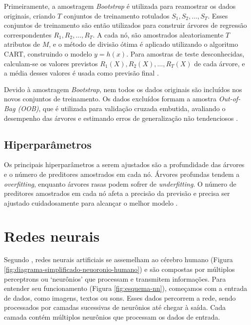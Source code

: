 Primeiramente, a amostragem \textit{Bootstrap} é utilizada para reamostrar os dados originais, criando $T$ conjuntos de treinamento rotulados $S_1, S_2, \ldots, S_T$. Esses conjuntos de treinamento são então utilizados para construir árvores de regressão correspondentes $R_1, R_2, \ldots, R_T$. A cada nó, são amostrados aleatoriamente $T$ atributos de $M$, e o método de divisão ótima é aplicado utilizando o algoritmo CART, construindo o modelo $y = h(x)$. Para amostras de teste desconhecidas, calculam-se os valores previstos $R_1(X), R_2(X), \ldots, R_T(X)$ de cada árvore, e a média desses valores é usada como previsão final \cite{Wang2023}.

Devido à amostragem \textit{Bootstrap}, nem todos os dados originais são incluídos nos novos conjuntos de treinamento. Os dados excluídos formam a amostra \textit{Out-of-Bag (OOB)}, que é utilizada para validação cruzada embutida, avaliando o desempenho das árvores e estimando erros de generalização não tendenciosos \cite{Wang2023}.

 \subsection{Hiperparâmetros}

Os principais hiperparâmetros a serem ajustados são a profundidade das árvores e o número de preditores amostrados em cada nó. Árvores profundas tendem a \textit{overfitting}, enquanto árvores rasas podem sofrer de \textit{underfitting}. O número de preditores amostrados em cada nó afeta a precisão da previsão e precisa ser ajustado cuidadosamente para alcançar o melhor modelo \cite{Wang2023}.



\section{Redes neurais}

Segundo \cite{Kufel2023}, redes neurais artificiais se assemelham ao cérebro humano (Figura \ref{fig:diagrama-simplificado-neuoronio-humano}) e são compostas por múltiplos perceptrons ou ‘neurônios’ que processam e transmitem informações. Para entender seu funcionamento (Figura \ref{fig:esquema-nn}), começamos com a entrada de dados, como imagens, textos ou sons. Esses dados percorrem a rede, sendo processados por camadas sucessivas de neurônios até chegar à saída. Cada camada contém múltiplos neurônios que processam os dados de entrada.

\pagebreak

